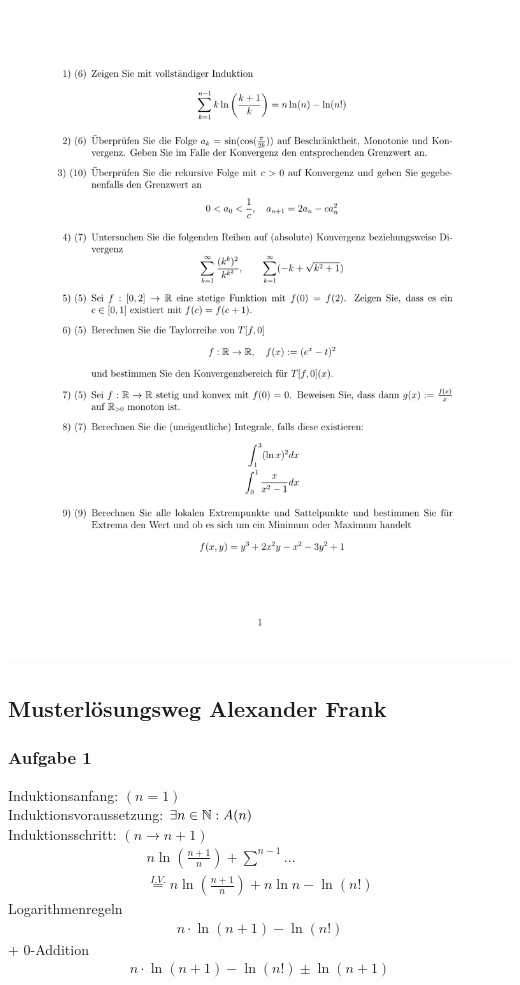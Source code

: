 \vspace*{-3cm}\textbf{}\\
\hspace*{-2.5cm}
\includegraphics[page=1]{2022.07.05/Probeklausur2.pdf}    

\subsection{Musterlösungsweg Alexander Frank}
\subsubsection{Aufgabe 1}
Induktionsanfang: $(n = 1)$\\
Induktionsvoraussetzung: $\exists n \in \mathbb N: A(n)$\\
Induktionsschritt: $(n \rightarrow n+1)$
\begin{align*}
    n\ln(\frac{n+1}{n}) + \sum^{n - 1} ...\\
    \overset{I.V.}{=} n \ln(\frac{n+1}{n}) + n \ln n - \ln (n!)
\end{align*}
Logarithmenregeln
\begin{align*}
    n\cdot \ln(n +1) - \ln(n!)
\end{align*}
+ $0$-Addition
\begin{align*}
    n \cdot \ln(n +1) - \ln (n!) \pm \ln(n+1)
\end{align*}
